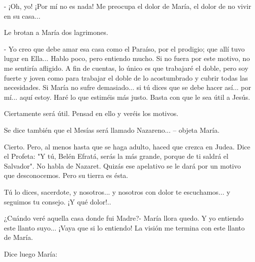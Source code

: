 \documentclass[12pt, twoside, openright]{book} %
\begin{document}
- ¡Oh, yo! ¡Por mí no es nada! Me preocupa el dolor de María, el dolor de no vivir en su casa... 

Le brotan a María dos lagrimones. 

- Yo creo que debe amar esa casa como el Paraíso, por el prodigio; que allí tuvo lugar en Ella... Hablo poco, pero entiendo mucho. Si no fuera por este motivo, no me sentiría afligido. A fin de cuentas, lo único es que trabajaré el doble, pero soy fuerte y joven como para trabajar el doble de lo acostumbrado y cubrir todas las necesidades. Si María no sufre demasiado... si tú dices que se debe hacer así... por mí... aquí estoy. Haré lo que estiméis más justo. Basta con que le sea útil a Jesús. 

Ciertamente será útil. Pensad en ello y veréis los motivos. 

Se dice también que el Mesías será llamado Nazareno... – objeta María. 

Cierto. Pero, al menos hasta que se haga adulto, haced que crezca en Judea. Dice el Profeta: "Y tú, Belén Efratá, serás la más grande, porque de ti saldrá el Salvador". No habla de Nazaret. Quizás ese apelativo se le dará por un motivo que desconocemos. Pero su tierra es ésta. 

Tú lo dices, sacerdote, y nosotros... y nosotros con dolor te escuchamos... y seguimos tu consejo. ¡Y qué dolor!.. 

¿Cuándo veré aquella casa donde fui Madre?- María llora quedo. Y yo entiendo este llanto suyo... ¡Vaya que si lo entiendo! La visión me termina con este llanto de María. 

Dice luego María: 
\end{document}
